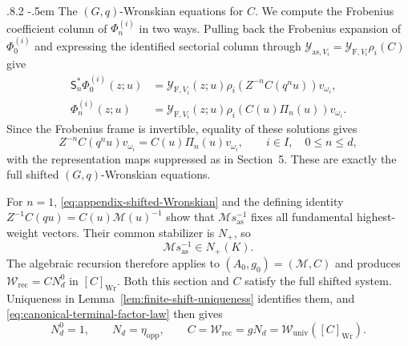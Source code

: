 \documentclass[11pt,leqno]{amsart}
\makeatletter
\numberwithin{equation}{section}
\renewcommand\paragraph{\@startsection{paragraph}{4}{\z@}%
  {.8\baselineskip \@plus .2\baselineskip}%
  {-.5em}%
  {\normalfont\normalsize\bfseries}}
\theoremstyle{plain}
\theoremstyle{definition}
\theoremstyle{plain}
\theoremstyle{definition}
\theoremstyle{remark}
\makeatother
\begin{document}
\paragraph{The $(G,q)$-Wronskian equations for $C$.}
We compute the Frobenius coefficient column of $\Phi_n^{(i)}$ in two ways.  Pulling back the Frobenius expansion of $\Phi_0^{(i)}$ and expressing the identified sectorial column through $\mathcal Y_{\mathrm{as},V_i}=\mathcal Y_{\mathrm F,V_i}\rho_i(C)$ give
\[
 \begin{aligned}
 \mathsf S_n^*\Phi_0^{(i)}(z;u)
 &=\mathcal Y_{\mathrm F,V_i}(z;u)
       \rho_i\!\left(Z^{-n}C(q^nu)\right)v_{\omega_i},\\
 \Phi_n^{(i)}(z;u)
 &=\mathcal Y_{\mathrm F,V_i}(z;u)
       \rho_i\!\left(C(u)\Pi_n(u)\right)v_{\omega_i}.
 \end{aligned}
\]
Since the Frobenius frame is invertible, equality of these solutions gives
\begin{equation}\label{eq:appendix-shifted-Wronskian}
 Z^{-n}C(q^nu)v_{\omega_i}
 =C(u)\Pi_n(u)v_{\omega_i},
 \qquad i\in I,\quad 0\le n\le d,
\end{equation}
with the representation maps suppressed as in Section~5.  These are exactly the full shifted $(G,q)$-Wronskian equations.

For $n=1$, \eqref{eq:appendix-shifted-Wronskian} and the defining identity
$Z^{-1}C(qu)=C(u)\mathscr M(u)^{-1}$
show that $\mathscr M s_{\mathrm{as}}^{-1}$ fixes all fundamental highest-weight vectors.  Their common stabilizer is $N_+$, so
\[
 \mathscr M s_{\mathrm{as}}^{-1}\in N_+(K).
\]
The algebraic recursion therefore applies to $(A_0,g_0)=(\mathscr M,C)$ and produces
$\mathscr W_{\mathrm{rec}}=CN_d^0$ in $[C]_{\mathrm{Wr}}$.
Both this section and $C$ satisfy the full shifted system.  Uniqueness in Lemma~\ref{lem:finite-shift-uniqueness} identifies them, and \eqref{eq:canonical-terminal-factor-law} then gives
\begin{equation}\label{eq:canonical-terminal-factor-is-eta}
 N_d^0=1,\qquad
 N_d=\eta_{\mathrm{opp}},\qquad
 C=\mathscr W_{\mathrm{rec}}
  =gN_d
  =\mathscr W_{\mathrm{univ}}([C]_{\mathrm{Wr}}).
\end{equation}
\end{document}
